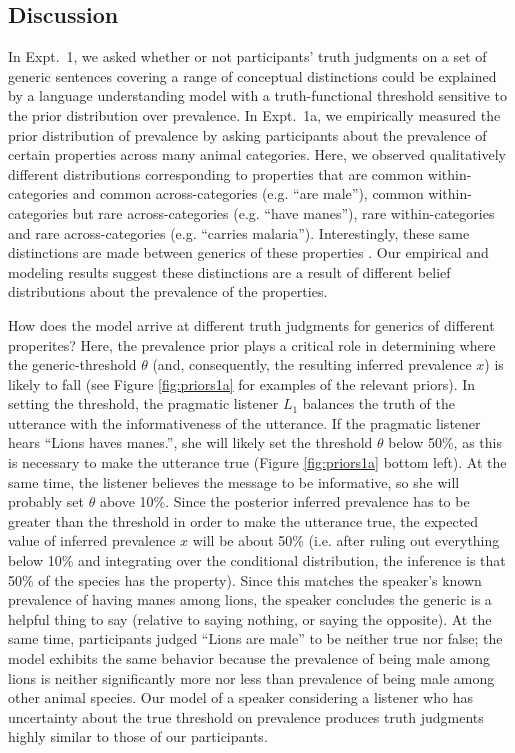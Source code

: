 \documentclass[10pt,letterpaper]{article}
\begin{document}
\subsection{Discussion}

In Expt.~1, we asked whether or not participants' truth judgments on a set of generic sentences covering a range of conceptual distinctions could be explained by a language understanding model with a truth-functional threshold sensitive to the prior distribution over prevalence. 
In Expt.~1a, we empirically measured the prior distribution of prevalence by asking participants about the prevalence of certain properties across many animal categories. 
Here, we observed qualitatively different distributions corresponding to properties that are common within-categories and common across-categories (e.g. ``are male''), common within-categories but rare across-categories (e.g. ``have manes''), rare within-categories and rare across-categories (e.g. ``carries malaria''). Interestingly, these same distinctions are made between generics of these properties \cite{Prasada2013}. 
Our empirical and modeling results suggest these distinctions are a result of different belief distributions about the prevalence of the properties.

How does the model arrive at different truth judgments for generics of different properites?
Here, the prevalence prior plays a critical role in determining where the generic-threshold $\theta$ (and, consequently, the resulting inferred prevalence $x$) is likely to fall (see Figure \ref{fig:priors1a} for examples of the relevant priors). 
In setting the threshold, the pragmatic listener $L_{1}$ balances the truth of the utterance with the informativeness of the utterance. 
If the pragmatic listener hears ``Lions haves manes.'', she will likely set the threshold $\theta$ below 50\%, as this is necessary to make the utterance true (Figure \ref{fig:priors1a} bottom left). 
At the same time, the listener believes the message to be informative, so she will probably set $\theta$ above 10\%. 
Since the posterior inferred prevalence has to be greater than the threshold in order to make the utterance true, the expected value of inferred prevalence $x$ will be about 50\% (i.e. after ruling out everything below 10\% and integrating over the conditional distribution, the inference is that 50\% of the species has the property). 
Since this matches the speaker's known prevalence of having manes among lions, the speaker concludes the generic is a helpful thing to say (relative to saying nothing, or saying the opposite).
At the same time, participants judged ``Lions are male'' to be neither true nor false; the model exhibits the same behavior because the prevalence of being male among lions is neither significantly more nor less than prevalence of being male among other animal species. 
Our model of a speaker considering a listener who has uncertainty about the true threshold on prevalence produces truth judgments highly similar to those of our participants.
\end{document}
